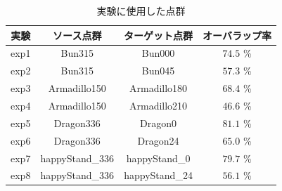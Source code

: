 \documentclass[twocolumn, 9pt, a4j, dvipdfmx]{jsarticle}
\begin{document}
\begin{table}[H]
    \begin{center}
    \small
    \caption{実験に使用した点群 \label{dynamic_reg_table}}
    \begin{tabular}{c ccc} \hline
        実験 & ソース点群 & ターゲット点群     & オーバラップ率 \\ \hline \hline
        exp1 &  Bun315  &  Bun000  & $ 74.5 $ \%    \\
        exp2 &  Bun315  &  Bun045  & $ 57.3 $ \%    \\ \hline
        exp3 &  Armadillo150  &  Armadillo180  & $ 68.4 $ \%    \\
        exp4 &  Armadillo150  &  Armadillo210  & $ 46.6 $ \%    \\ \hline
        exp5 &  Dragon336  &  Dragon0   & $ 81.1 $ \%    \\
        exp6 &  Dragon336  &  Dragon24  & $ 65.0 $ \%    \\ \hline
        exp7 &  happyStand\_336  &  happyStand\_0  & $ 79.7 $ \%    \\
        exp8 &  happyStand\_336  &  happyStand\_24 & $ 56.1 $ \%    \\ \hline


\end{tabular}
\end{center}
\end{table}
\end{document}
